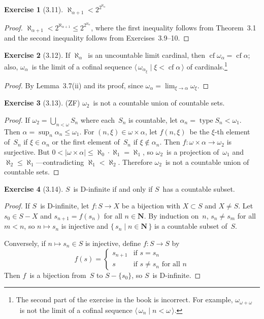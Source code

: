 \documentclass[letterpaper,12pt]{article}
\newcommand{\N}{\boldsymbol{N}}
\newcommand{\al}{\aleph}
\newcommand{\bigunion}{\bigcup}
\newcommand{\mult}{\cdot}
\DeclareMathOperator{\type}{type}
\DeclareMathOperator{\cf}{cf}
\newcommand{\card}[1]{|#1|}
\newcommand{\seq}[1]{\langle#1\rangle}
\theoremstyle{definition}
\newtheorem*{exer}{Exercise}
\theoremstyle{remark}
\begin{document}
\begin{exer}[3.11]
\(\al_{\alpha+1}<2^{2^{\al_{\alpha}}}\)
\end{exer}
\begin{proof}
\(\al_{\alpha+1}<2^{\al_{\alpha+1}}\le 2^{2^{\al_{\alpha}}}\), where the first inequality follows from Theorem~3.1 and the second inequality follows from Exercises~3.9--10.
\end{proof}

\begin{exer}[3.12]
If \(\al_{\alpha}\)~is an uncountable limit cardinal, then \(\cf\omega_{\alpha}=\cf\alpha\); also, \(\omega_{\alpha}\)~is the limit of a cofinal sequence \(\seq{\,\omega_{\alpha_{\xi}}\mid\xi<\cf\alpha\,}\) of cardinals.\footnote{The second part of the exercise in the book is incorrect. For example, \(\omega_{\omega+\omega}\)~is not the limit of a cofinal sequence \(\seq{\,\omega_n\mid n<\omega\,}\).}
\end{exer}
\begin{proof}
By Lemma~3.7(ii) and its proof, since \(\omega_{\alpha}=\lim_{\xi\to\alpha}\omega_{\xi}\).
\end{proof}

\begin{exer}[3.13]
(ZF) \(\omega_2\)~is not a countable union of countable sets.
\end{exer}
\begin{proof}
If \(\omega_2=\bigunion_{n<\omega} S_n\) where each~\(S_n\) is countable, let \(\alpha_n=\type S_n<\omega_1\). Then \(\alpha=\sup_n\alpha_n\le\omega_1\). For \((n,\xi)\in\omega\times\alpha\), let \(f(n,\xi)\)~be the \(\xi\)-th element of~\(S_n\) if \(\xi\in\alpha_n\) or the first element of~\(S_n\) if \(\xi\not\in\alpha_n\). Then \(f:\omega\times\alpha\to\omega_2\) is surjective. But \(0<\card{\omega\times\alpha}\le\al_0\mult\al_1=\al_1\), so \(\omega_2\)~is a projection of~\(\omega_1\) and \(\al_2\le\al_1\)---contradicting \(\al_1<\al_2\). Therefore \(\omega_2\)~is not a countable union of countable sets.
\end{proof}

\begin{exer}[3.14]
\(S\)~is D-infinite if and only if \(S\)~has a countable subset.
\end{exer}
\begin{proof}
If \(S\)~is D-infinite, let \(f:S\to X\) be a bijection with \(X\subset S\) and \(X\ne S\). Let \(s_0\in S-X\) and \(s_{n+1}=f(s_n)\) for all \(n\in\N\). By induction on~\(n\), \(s_n\ne s_m\) for all \(m<n\), so \(n\mapsto s_n\) is injective and \(\{\,s_n\mid n\in\N\,\}\) is a countable subset of~\(S\).

Conversely, if \(n\mapsto s_n\in S\) is injective, define \(f:S\to S\) by
\[f(s)=\begin{cases}
s_{n+1}&\text{if }s=s_n\\
s&\text{if }s\ne s_n\text{ for all }n
\end{cases}\]
Then \(f\)~is a bijection from~\(S\) to \(S-\{s_0\}\), so \(S\)~is D-infinite.
\end{proof}
\end{document}
